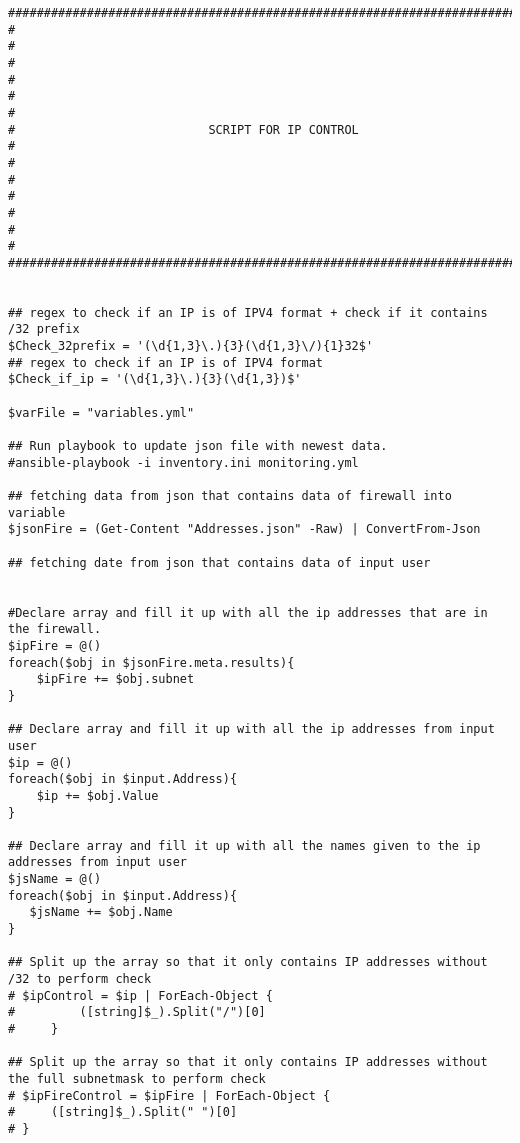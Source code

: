 \documentclass[dutch,dit,thesis]{hogentreport}
\begin{document}
\begin{lstlisting}[caption={main.ps1 Powershell script}]
###################################################################################
#                                                                                 #
#                                                                                 #
#                                                                                 #  
#                           SCRIPT FOR IP CONTROL                                 #             
#                                                                                 #
#                                                                                 #  
#                                                                                 #
###################################################################################


## regex to check if an IP is of IPV4 format + check if it contains /32 prefix
$Check_32prefix = '(\d{1,3}\.){3}(\d{1,3}\/){1}32$'
## regex to check if an IP is of IPV4 format
$Check_if_ip = '(\d{1,3}\.){3}(\d{1,3})$' 

$varFile = "variables.yml"

## Run playbook to update json file with newest data.
#ansible-playbook -i inventory.ini monitoring.yml

## fetching data from json that contains data of firewall into variable
$jsonFire = (Get-Content "Addresses.json" -Raw) | ConvertFrom-Json

## fetching date from json that contains data of input user


#Declare array and fill it up with all the ip addresses that are in the firewall. 
$ipFire = @()
foreach($obj in $jsonFire.meta.results){
    $ipFire += $obj.subnet
}

## Declare array and fill it up with all the ip addresses from input user
$ip = @()
foreach($obj in $input.Address){
    $ip += $obj.Value
}

## Declare array and fill it up with all the names given to the ip addresses from input user
$jsName = @()
foreach($obj in $input.Address){
   $jsName += $obj.Name
}

## Split up the array so that it only contains IP addresses without /32 to perform check 
# $ipControl = $ip | ForEach-Object {
#         ([string]$_).Split("/")[0] 
#     } 

## Split up the array so that it only contains IP addresses without the full subnetmask to perform check
# $ipFireControl = $ipFire | ForEach-Object {
#     ([string]$_).Split(" ")[0] 
# } 


\end{lstlisting}
\end{document}
